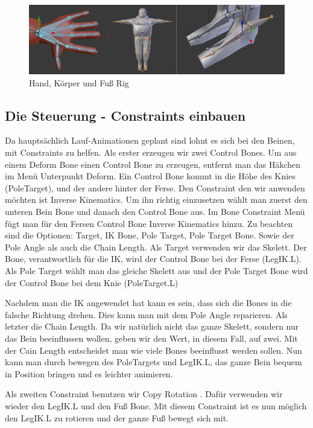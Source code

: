 \begin{figure}[H]
    \centering

    \includegraphics[width=.8\textwidth]{images/rigging_umsetzung.png}
    \caption{Hand, Körper und Fuß Rig}
\end{figure}

\subsection{Die Steuerung - Constraints einbauen}
Da hauptsächlich Lauf-Animationen geplant sind lohnt es sich bei den Beinen, mit Constraints zu helfen.
Als erster erzeugen wir zwei Control Bones. Um aus einem Deform Bone einen Control Bone zu erzeugen, entfernt man das Häkchen im Menü Unterpunkt
\dq Deform\dq. Ein Control Bone kommt in die Höhe des Knies (PoleTarget), und der andere hinter der Ferse. Den Constraint den wir anwenden möchten ist
\dq Inverse Kinematics\dq. Um ihn richtig einzusetzen wählt man zuerst den unteren Bein Bone und danach den Control Bone aus. Im Bone Constraint Menü fügt man für den Fersen Control Bone
Inverse Kinematics hinzu. Zu beachten sind die Optionen: Target, IK Bone, Pole Target, Pole Target Bone. Sowie der Pole Angle als auch die Chain Length. Als Target verwenden wir das Skelett.
Der Bone, verantwortlich für die IK,
wird der Control Bone bei der Ferse (LegIK.L). Als Pole Target wählt man das gleiche Skelett aus und der Pole Target Bone wird der Control Bone bei dem Knie (PoleTarget.L)

Nachdem man die IK angewendet hat kann es sein, dass sich die Bones in die falsche Richtung drehen.
Dies kann man mit dem Pole Angle reparieren. Als letzter die Chain Length. Da wir natürlich nicht das ganze Skelett, sondern nur das Bein beeinflussen wollen, geben wir den Wert,
in diesem Fall, auf zwei. Mit der Cain Length entscheidet man wie viele Bones beeinflusst werden sollen.
Nun kann man durch bewegen des PoleTargets und LegIK.L, das ganze Bein bequem in Position bringen und es leichter animieren.

Als zweiten Constraint benutzen wir \dq Copy Rotation \dq.
Dafür verwenden wir wieder den LegIK.L und den Fuß Bone. Mit diesem Constraint ist es nun möglich den LegIK.L zu rotieren und der ganze Fuß bewegt sich mit.

